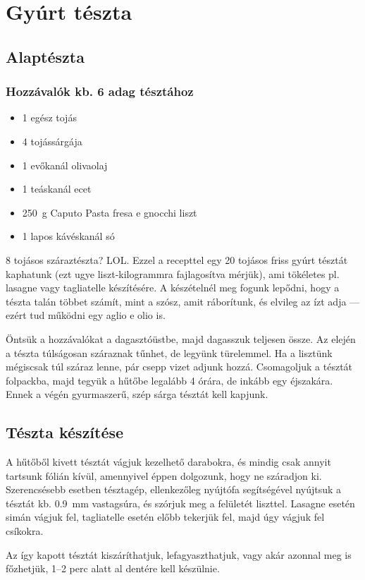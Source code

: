 \newpage
\section*{Gyúrt tészta} \label{sec:gyurt-teszta}

\subsection*{Alaptészta}
\subsubsection*{Hozzávalók kb. 6 adag tésztához}
\begin{itemize}
    \item \num{1} egész tojás
    \item \num{4} tojássárgája
    \item \num{1} evőkanál olivaolaj
    \item \num{1} teáskanál ecet
    \item \qty{250}{\g} Caputo Pasta fresa e gnocchi liszt
    \item \num{1} lapos kávéskanál só
\end{itemize}

\num{8} tojásos száraztészta? LOL. Ezzel a recepttel egy \num{20} tojásos friss gyúrt tésztát kaphatunk (ezt ugye liszt-kilogrammra fajlagosítva mérjük), ami tökéletes pl. lasagne vagy tagliatelle készítésére. A készételnél meg fogunk lepődni, hogy a tészta talán többet számít, mint a szósz, amit ráborítunk, és elvileg az ízt adja --- ezért tud működni egy aglio e olio is.

Öntsük a hozzávalókat a dagasztóüstbe, majd dagasszuk teljesen össze. Az elején a tészta túlságosan száraznak tűnhet, de legyünk türelemmel. Ha a lisztünk mégiscsak túl száraz lenne, pár csepp vizet adjunk hozzá. Csomagoljuk a tésztát folpackba, majd tegyük a hűtőbe legalább \num{4} órára, de inkább egy éjszakára. Ennek a végén gyurmaszerű, szép sárga tésztát kell kapjunk.~\cite{szell_gyurt_teszta}

\subsection*{Tészta készítése}
A hűtőből kivett tésztát vágjuk kezelhető darabokra, és mindig csak annyit tartsunk fólián kívül, amennyivel éppen dolgozunk, hogy ne száradjon ki. Szerencsésebb esetben tésztagép, ellenkezőleg nyújtófa segítségével nyújtsuk a tésztát kb. \qty{0.9}{\mm} vastagsúra, és szórjuk meg a felületét liszttel. Lasagne esetén simán vágjuk fel, tagliatelle esetén előbb tekerjük fel, majd úgy vágjuk fel csíkokra.

Az így kapott tésztát kiszáríthatjuk, lefagyaszthatjuk, vagy akár azonnal meg is főzhetjük, \numrange{1}{2} perc alatt al dentére kell készülnie.
